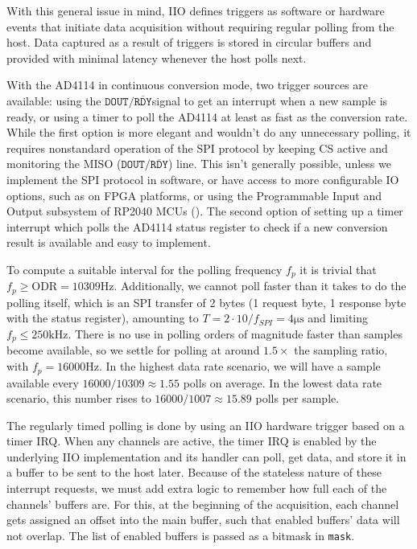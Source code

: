 \documentclass{thesis}
\newcommand{\Hz}{\unit{\hertz}}
\newcommand{\kHz}{\unit{\kilo\hertz}}
\newcommand{\us}{\unit{\micro\second}}
\newcommand{\drdy}{{\ensuremath{\mathtt{DOUT/}\overline{\mathtt{RDY}}}}}
\begin{document}
With this general issue in mind, IIO defines triggers as software or hardware events that initiate data acquisition without requiring regular polling from the host. Data captured as a result of triggers is stored in circular buffers and provided with minimal latency whenever the host polls next.

With the AD4114 in continuous conversion mode, two trigger sources are available: using the \drdy signal to get an interrupt when a new sample is ready, or using a timer to poll the AD4114 at least as fast as the conversion rate. While the first option is more elegant and wouldn't do any unnecessary polling, it requires nonstandard operation of the SPI protocol by keeping CS active and monitoring the MISO (\drdy) line. This isn't generally possible, unless we implement the SPI protocol in software, or have access to more configurable IO options, such as on FPGA platforms, or using the Programmable Input and Output subsystem of RP2040 MCUs (\cite{Smith2021}). The second option of setting up a timer interrupt which polls the AD4114 status register to check if a new conversion result is available and easy to implement.

To compute a suitable interval for the polling frequency $f_p$ it is trivial that $f_p \geq \text{ODR} = 10309\Hz$. Additionally, we cannot poll faster than it takes to do the polling itself, which is an SPI transfer of 2 bytes (1 request byte, 1 response byte with the status register), amounting to $T = 2 \cdot 10 / f_{SPI} = 4\us$ and limiting $f_p \leq 250\kHz$. There is no use in polling orders of magnitude faster than samples become available, so we settle for polling at around $1.5\times$ the sampling ratio, with $f_p = 16000\Hz$. In the highest data rate scenario, we will have a sample available every $16000/10309 \approx 1.55$ polls on average. In the lowest data rate scenario, this number rises to $16000/1007 \approx 15.89$ polls per sample.

The regularly timed polling is done by using an IIO hardware trigger based on a timer IRQ. When any channels are active, the timer IRQ is enabled by the underlying IIO implementation and its handler can poll, get data, and store it in a buffer to be sent to the host later. Because of the stateless nature of these interrupt requests, we must add extra logic to remember how full each of the channels' buffers are. For this, at the beginning of the acquisition, each channel gets assigned an offset into the main buffer, such that enabled buffers' data will not overlap. The list of enabled buffers is passed as a bitmask in \texttt{mask}. 
\end{document}
